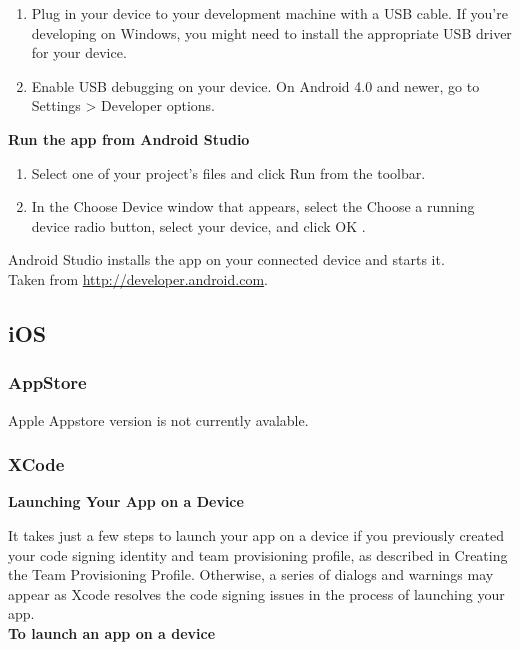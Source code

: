 \begin{enumerate}
\item Plug in your device to your development machine with a USB cable. If you're developing on Windows, you might need to install the appropriate USB driver for your device. 
\item Enable USB debugging on your device. On Android 4.0 and newer, go to Settings > Developer options. 
\end{enumerate}

\textbf{Run the app from Android Studio}\\
\begin{enumerate}
\item Select one of your project's files and click Run from the toolbar.
\item In the Choose Device window that appears, select the Choose a running device radio button, select your device, and click OK .
\end{enumerate}

Android Studio installs the app on your connected device and starts it.\\

Taken from \href{http://developer.android.com/training/basics/firstapp/running-app.html}{http://developer.android.com}.

\subsection{iOS}
\subsubsection{AppStore}

Apple Appstore version is not currently avalable.

\subsubsection{XCode}

\textbf{Launching Your App on a Device}


It takes just a few steps to launch your app on a device if you previously created your code signing identity and team provisioning profile, as described in Creating the Team Provisioning Profile. Otherwise, a series of dialogs and warnings may appear as Xcode resolves the code signing issues in the process of launching your app.\\


\textbf{To launch an app on a device}

